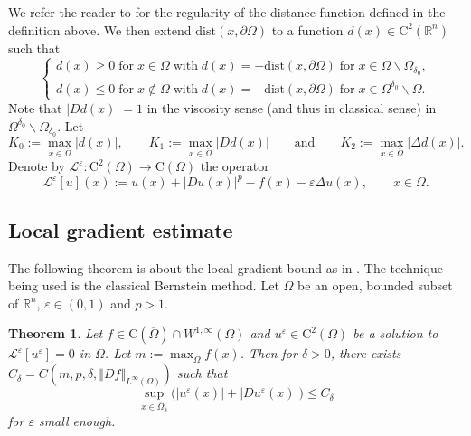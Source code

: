 \documentclass[12pt,reqno]{amsart}
\numberwithin{figure}{section}
\theoremstyle{plain}
\newtheorem{thm}{Theorem}[section]
\theoremstyle{remark}
\numberwithin{equation}{section}
\newcommand{\R}{\mathbb{R}}
\newcommand{\rmC}{\mathrm{C}}
\begin{document}
We refer the reader to \cite{gilbarg_elliptic_2001} for the regularity of the distance function defined in the definition above. We then extend $\mathrm{dist}(x,\partial\Omega)$ to a function $d(x)\in \mathrm{C}^2(\mathbb{R}^n)$ such that 
\begin{equation}\label{e:distance_def}
    \begin{cases}
    d(x)\geq 0\;\text{for}\;x\in\Omega\;\text{with}\;d(x) = +\mathrm{dist}(x,\partial\Omega)\;\text{for}\;x\in \Omega\backslash \Omega_{\delta_0},\\
    d(x)\leq 0\;\text{for}\;x\notin \Omega\;\text{with}\;d(x) = -\mathrm{dist}(x,\partial\Omega)\;\text{for}\;x\in \Omega^{\delta_0}\backslash \Omega.
    \end{cases}
\end{equation}
Note that $|D d(x)| = 1$ in the viscosity sense (and thus in classical sense) in $\Omega^{\delta_0}\backslash \Omega_{\delta_0}$. Let 
\begin{equation}\label{boundond}
   K_0:= \max_{x\in \overline{\Omega}}|d(x)|, \qquad K_1 := \max_{x\in \overline{\Omega}} |D d(x)| \qquad\text{and}\qquad K_2 := \max_{x\in \overline{\Omega}} |\Delta d(x)|.
\end{equation}
\noindent Denote by $\mathcal{L}^\varepsilon:\rmC^2(\Omega)\to \rmC(\Omega)$ the operator
\begin{equation*}
    \mathcal{L}^\varepsilon[u](x) :=   u(x) + |Du(x)|^p - f(x) - \varepsilon \Delta u(x), \qquad x\in \Omega.
\end{equation*}



\subsection{Local gradient estimate} 
The following theorem is about the local gradient bound as in \cite[Appendix]{Lasry1989}. The technique being used is the classical Bernstein method. Let $\Omega$ be an open, bounded subset of $\R^n$, $\varepsilon \in (0,1)$ and $p>1$.

\begin{thm}\label{thm:grad_1} Let $f\in \rmC(\overline{\Omega})\cap W^{1,\infty}(\Omega)$ and $u^\varepsilon \in \mathrm{C}^2(\Omega)$ be a solution to $\mathcal{L}^\varepsilon[u^\varepsilon] = 0$ in $\Omega$. Let $m:= \max_{\overline{\Omega}}f(x)$. Then for $\delta>0$, there exists $C_\delta = C(m,p,\delta, \Vert D f\Vert_{L^\infty(\Omega)})$ such that 
\begin{equation*}
    \sup_{x\in \overline{\Omega}_\delta} \Big(|u^\varepsilon(x)|+|Du^\varepsilon(x)|\Big) \leq C_\delta
\end{equation*}
for $\varepsilon$ small enough.
\end{thm}
\end{document}
